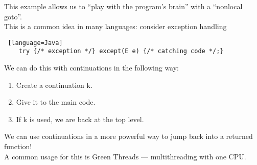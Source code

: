 \documentclass[../../lecture_notes.tex]{subfiles}
\begin{document}
\noindent This example allows us to “play with the program’s brain” with a “nonlocal goto”.\\
This is a common idea in many languages: consider exception handling\\
\begin{lstlisting} [language=Java]
	try {/* exception */} except(E e) {/* catching code */;}
\end{lstlisting}
We can do this with continuations in the following way:
\begin{enumerate} [itemsep=0mm]
	\item Create a continuation k.
	\item Give it to the main code.
	\item If k is used, we are back at the top level.
\end{enumerate}
\noindent We can use continuations in a more powerful way to jump back into a returned function!\\
A common usage for this is Green Threads — multithreading with one CPU.\\
\end{document}
